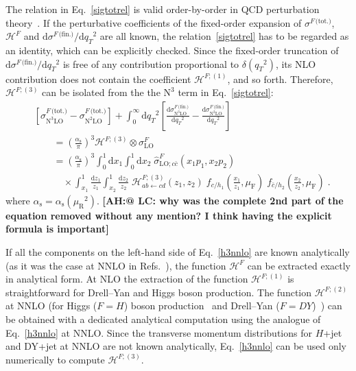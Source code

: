 \documentclass[12pt]{article}
\DeclareRobustCommand{\nn}{\nonumber}
\DeclareRobustCommand{\AH}[1]{\textbf{\quad\color{purple}[AH:\quad #1]}\xspace}
\DeclareRobustCommand{\alphas}{\ensuremath{\alpha_{\mathrm{s}}}\xspace}
\DeclareRobustCommand{\as}{\alphas}
\DeclareRobustCommand{\asOpi}{\ensuremath{\left(\frac{\as}{\pi}\right)}} %
\DeclareRobustCommand{\mur}{\ensuremath{\mu_{\mathrm{R}}}\xspace}
\DeclareRobustCommand{\muR}{\mur}
\DeclareRobustCommand{\muf}{\ensuremath{\mu_{\mathrm{F}}}\xspace}
\DeclareRobustCommand{\qt}{\ensuremath{q_T}\xspace}
\DeclareRobustCommand{\rd}{\ensuremath{\mathrm{d}}}
\DeclareRobustCommand{\cH}{\ensuremath{\mathcal{H}}}
\DeclareRobustCommand{\fin}{\text{(fin.)}\xspace}
\DeclareRobustCommand{\tot}{\text{(tot.)}\xspace}
\DeclareRobustCommand{\LO}{\text{LO}\xspace}
\DeclareRobustCommand{\N}[1]{\ensuremath{\text{N}^{#1}}} %
\begin{document}
The relation in Eq.~\eqref{sigtotrel} is valid order-by-order in QCD perturbation theory~\cite{Bozzi:2005wk}. If the perturbative coefficients of the fixed-order expansion of $\sigma^{F\,\tot}$, $\cH^F$ and $\rd \sigma^{F\,\fin}/\rd \qt^2$ are all known, the relation~\eqref{sigtotrel} has to be regarded as an identity, which can be explicitly checked. Since the fixed-order truncation of $\rd \sigma^{F\,\fin}/\rd \qt^2$ is free of any contribution proportional to $\delta(\qt^2)$, its NLO contribution  does not contain the coefficient $\cH^{F;(1)}$, and so forth. 
Therefore, $\cH^{F;(3)}$ can be isolated from the  the  \N3\LO  term in Eq.~\eqref{sigtotrel}:
\begin{align}
  &
  \left[
    \sigma^{F\,\tot}_{\N3\LO} - 
    \sigma^{F\,\tot}_{\N2\LO}
  \right] +
  \int_0^\infty\rd\qt^2 \left[
    \frac{\rd\sigma^{F\,\fin}_{\N3\LO}}{\rd\qt^2} -
    \frac{\rd\sigma^{F\,\fin}_{\N2\LO}}{\rd\qt^2}
  \right]
  \nn\\&\qquad= 
  \asOpi^3 \cH^{F;(3)} \otimes \sigma^F_{\LO}
  \nn\\&\qquad=
  \asOpi^3 \int_0^1\rd x_1 \int_0^1\rd x_2 \;
  \hat{\sigma}^{F}_{\LO;c\bar{c}}(x_1 p_1, x_2 p_2)
  \nn\\&\qquad\quad\times
  \int_{x_1}^1 \frac{\rd z_1}{z_1} \int_{x_2}^1 \frac{\rd z_2}{z_2} \;
  \cH^{F;(3)}_{ab \gets cd}(z_1, z_2) \;
  f_{c/h_1}\left(\frac{x_1}{z_1},\muf\right) \; f_{\bar{c}/h_2}\left(\frac{x_2}{z_2},\muf\right) \;.
  \label{h3nnlo}
\end{align}
where $\as=\as(\muR^2)$.
\AH{@ LC: why was the complete 2nd part of the equation removed without any mention? I think having the explicit formula is important}

If all the components on the left-hand side of Eq.~\eqref{h3nnlo} are known analytically (as it was the case at NNLO in Refs.~\cite{Catani:2011kr,Catani:2012qa}), the function $\cH^{F}$ can be extracted exactly in analytical form. At NLO the extraction of the function  $\cH^{F;(1)}$ is straightforward for Drell--Yan and Higgs boson production. The function $\cH^{F;(2)}$ at NNLO (for Higgs ($F=H$) boson production~\cite{Catani:2011kr} and Drell--Yan ($F=DY$)~\cite{Catani:2012qa}) can be obtained with a dedicated analytical computation using the analogue of Eq.~\eqref{h3nnlo} at NNLO. Since the transverse momentum distributions for $H$+jet and DY+jet at NNLO are not known analytically, Eq.~\eqref{h3nnlo} can be used only numerically to compute $\cH^{F;(3)}$. 
\end{document}
